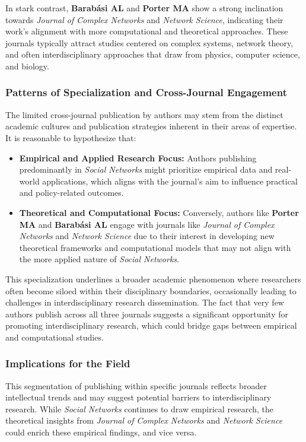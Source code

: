 \documentclass[twocolumn]{article}
\begin{document}
	In stark contrast, \textbf{Barabási AL} and \textbf{Porter MA} show a strong inclination towards \textit{Journal of Complex Networks} and \textit{Network Science}, indicating their work's alignment with more computational and theoretical approaches. These journals typically attract studies centered on complex systems, network theory, and often interdisciplinary approaches that draw from physics, computer science, and biology.
	
	\subsubsection*{Patterns of Specialization and Cross-Journal Engagement}
	
	The limited cross-journal publication by authors may stem from the distinct academic cultures and publication strategies inherent in their areas of expertise. It is reasonable to hypothesize that:
	\begin{itemize}
		\item \textbf{Empirical and Applied Research Focus:} Authors publishing predominantly in \textit{Social Networks} might prioritize empirical data and real-world applications, which aligns with the journal's aim to influence practical and policy-related outcomes.
		\item \textbf{Theoretical and Computational Focus:} Conversely, authors like \textbf{Porter MA} and \textbf{Barabási AL} engage with journals like \textit{Journal of Complex Networks} and \textit{Network Science} due to their interest in developing new theoretical frameworks and computational models that may not align with the more applied nature of \textit{Social Networks}.
	\end{itemize}
	
	This specialization underlines a broader academic phenomenon where researchers often become siloed within their disciplinary boundaries, occasionally leading to challenges in interdisciplinary research dissemination. The fact that very few authors publish across all three journals suggests a significant opportunity for promoting interdisciplinary research, which could bridge gaps between empirical and computational studies.
	
	\subsubsection*{Implications for the Field}
	
	This segmentation of publishing within specific journals reflects broader intellectual trends and may suggest potential barriers to interdisciplinary research. While \textit{Social Networks} continues to draw empirical research, the theoretical insights from \textit{Journal of Complex Networks} and \textit{Network Science} could enrich these empirical findings, and vice versa.
	
\end{document}
